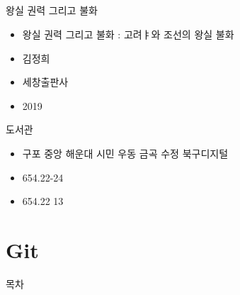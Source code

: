 \documentclass[aspectratio=1610,17pt,xcolor=pdftex,dvipsnames,table,handout]{beamer}
\begin{document}
		\begin{frame} [t,plain]
		\frametitle{}

			\begin{block} { 왕실 권력 그리고 불화 }
			\setlength{\leftmargini}{4em}			
			\begin{itemize}
				\item [제목]  	왕실 권력 그리고 불화  : 고려ㅑ와 조선의 왕실 불화
				\item [지은이]	김정희 
				\item [출판사]	세창출판사 
				\item [출판일]	2019
			\end{itemize}
			\end{block}						

			\begin{block} {도서관}
			\setlength{\leftmargini}{4em}			
			\begin{itemize}
				\item [도서관]	구포 중앙 해운대 시민 우동 금곡 수정 북구디지털	
				\item [중앙]		654.22-24
				\item [수정]		654.22 13
			\end{itemize}
			\end{block}						
								
		\end{frame}						





		\part{Git}
		\frame{\partpage}
		

		\begin{frame} [plain]{목차}
		\tableofcontents%
		\end{frame}


\end{document}

